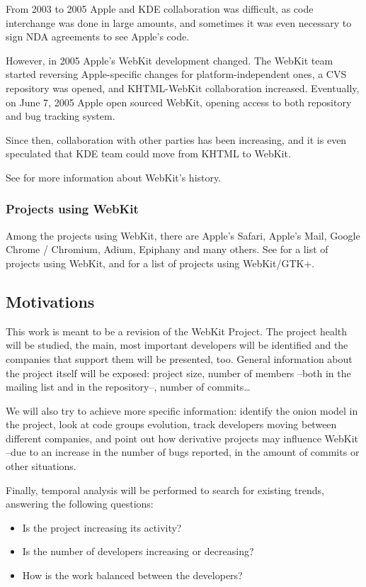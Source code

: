 \documentclass[12pt]{article}
\begin{document}
From 2003 to 2005 Apple and KDE collaboration was difficult, as code interchange was done in large amounts, and sometimes it was even necessary to sign NDA agreements to see Apple's code.

However, in 2005 Apple's WebKit development changed. The WebKit team started reversing Apple-specific changes for platform-independent ones, a CVS repository was opened, and KHTML-WebKit collaboration increased. Eventually, on June 7, 2005 Apple open sourced WebKit, opening access to both repository and bug tracking system.

Since then, collaboration with other parties has been increasing, and it is even speculated that KDE team could move from KHTML to WebKit.

See \cite{wiki:webkit} for more information about WebKit's history.
\subsubsection{Projects using WebKit}

Among the projects using WebKit, there are Apple's Safari, Apple's Mail, Google Chrome / Chromium, Adium, Epiphany and many others. See \cite{webkit:projects} for a list of projects using WebKit, and \cite{webkit:gtkprojects} for a list of projects using WebKit/GTK+.

\subsection{Motivations}

This work is meant to be a revision of the WebKit Project. The project health will be studied, the main, most important developers will be identified and the companies that support them will be presented, too. General information about the project itself will be exposed: project size, number of members --both in the mailing list and in the repository--, number of commits\dots

We will also try to achieve more specific information: identify the onion model in the project, look at code groups evolution, track developers moving between different companies, and point out how derivative projects may influence WebKit --due to an increase in the number of bugs reported, in the amount of commits or other situations.  

Finally, temporal analysis will be performed to search for existing trends, answering the following questions:
\begin{itemize}
\item Is the project increasing its activity? 
\item Is the number of developers increasing or decreasing?
\item How is the work balanced between the developers?
\end{itemize}
\end{document}
